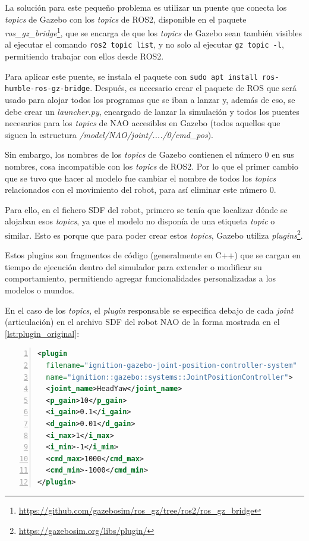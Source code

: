 La solución para este pequeño problema es utilizar un puente que conecta los \textit{topics} de Gazebo con los \textit{topics} de ROS2, disponible en el paquete \textit{ros\_gz\_bridge}\footnote{\url{https://github.com/gazebosim/ros_gz/tree/ros2/ros_gz_bridge}}, que se encarga de que los \textit{topics} de Gazebo sean también visibles al ejecutar el comando \texttt{ros2 topic list}, y no solo al ejecutar \texttt{gz topic -l}, permitiendo trabajar con ellos desde ROS2.

Para aplicar este puente, se instala el paquete con \texttt{sudo apt install ros-humble-ros-gz-bridge}. Después, es necesario crear el paquete de ROS que será usado para alojar todos los programas que se iban a lanzar y, además de eso, se debe crear un \textit{launcher.py}, encargado de lanzar la simulación y todos los puentes necesarios para los \textit{topics} de NAO accesibles en Gazebo (todos aquellos que siguen la estructura \textit{/model/NAO/joint/..../0/cmd\_pos}).

Sin embargo, los nombres de los \textit{topics} de Gazebo contienen el número 0 en sus nombres, cosa incompatible con los \textit{topics} de ROS2. Por lo que el primer cambio que se tuvo que hacer al modelo fue cambiar el nombre de todos los \textit{topics} relacionados con el movimiento del robot, para así eliminar este número 0. 

Para ello, en el fichero SDF del robot, primero se tenía que localizar dónde se alojaban esos \textit{topics}, ya que el modelo no disponía de una etiqueta \textit{topic} o similar. Esto es porque que para poder crear estos \textit{topics}, Gazebo utiliza \textit{plugins}\footnote{\url{https://gazebosim.org/libs/plugin/}}. 

Estos plugins son fragmentos de código (generalmente en C++) que se cargan en tiempo de ejecución dentro del simulador para extender o modificar su comportamiento, permitiendo agregar funcionalidades personalizadas a los modelos o mundos.

En el caso de los \textit{topics}, el \textit{plugin} responsable se especifica debajo de cada \textit{joint} (articulación) en el archivo SDF del robot NAO de la forma mostrada en el \autoref{lst:plugin_original}:

\begin{lstlisting}[language=XML, caption={Inclusión del plugin en el modelo}, label={lst:plugin_original}, numbers=left, backgroundcolor=\color{gray!10}]    
<plugin
  filename="ignition-gazebo-joint-position-controller-system"
  name="ignition::gazebo::systems::JointPositionController">
  <joint_name>HeadYaw</joint_name>
  <p_gain>10</p_gain>
  <i_gain>0.1</i_gain>
  <d_gain>0.01</d_gain>
  <i_max>1</i_max>
  <i_min>-1</i_min>
  <cmd_max>1000</cmd_max>
  <cmd_min>-1000</cmd_min>
</plugin>
\end{lstlisting}

